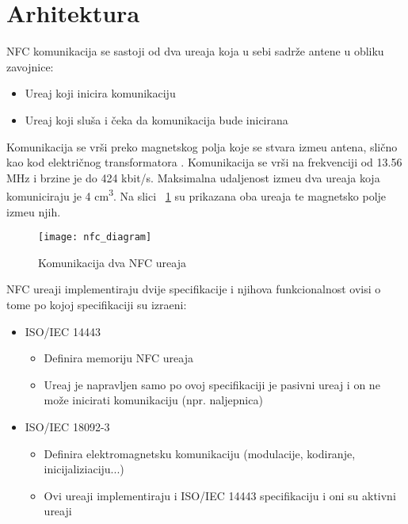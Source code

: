 \section{Arhitektura}

NFC komunikacija se sastoji od dva ure\dj aja koja u sebi sadr\v{z}e antene u obliku zavojnice:
\begin{itemize}
	\item Ure\dj aj koji inicira komunikaciju
	\item Ure\dj aj koji slu\v{s}a i \v{c}eka da komunikacija bude inicirana
\end{itemize}

Komunikacija se vr\v{s}i preko magnetskog polja koje se stvara izme\dj u antena, sli\v{c}no kao kod elektri\v{c}nog transformatora \cite{nfc_techonology}. Komunikacija se vr\v{s}i na frekvenciji od 13.56 MHz i brzine je do 424 kbit/s. Maksimalna udaljenost izme\dj u dva ure\dj aja koja komuniciraju je 4 cm\textsuperscript{3}. Na slici ~\ref{fig:nfc_arhitektura} su prikazana oba ure\dj aja te magnetsko polje izme\dj u njih.


\begin{figure}[!htbp]
	\begin{center}
 \texttt{[image: nfc\_diagram]}
 \caption{Komunikacija dva NFC ure\dj aja}
 \label{fig:nfc_arhitektura}
	\end{center}
\end{figure}

NFC ure\dj aji implementiraju dvije specifikacije i njihova funkcionalnost ovisi o tome po kojoj specifikaciji su izra\dj eni:

\begin{itemize}
	\item ISO/IEC 14443
	\begin{itemize}
		\item Definira memoriju NFC ure\dj aja
		\item Ure\dj aj je napravljen samo po ovoj specifikaciji je pasivni ure\dj aj i on ne mo\v{z}e inicirati komunikaciju (npr. naljepnica)
		
	\end{itemize}
	\item ISO/IEC 18092-3
	
	\begin{itemize}
		\item Definira elektromagnetsku komunikaciju (modulacije, kodiranje, inicijaliziaciju...)
		\item Ovi ure\dj aji implementiraju i ISO/IEC 14443 specifikaciju i oni su aktivni ure\dj aji
	\end{itemize}
\end{itemize}

